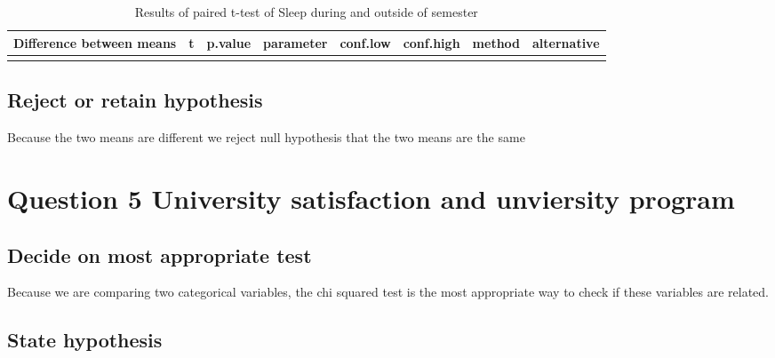 \documentclass[preprint, 3p,
authoryear]{elsarticle} %
\begin{document}
\begin{table}

\caption{\label{tab:unnamed-chunk-7}Results of paired t-test of Sleep during and outside of semester}
\centering
\fontsize{7}{9}\selectfont
\begin{tabular}[t]{r|r|r|r|r|r|l|l}
\hline
\textbf{Difference between means} & \textbf{t} & \textbf{p.value} & \textbf{parameter} & \textbf{conf.low} & \textbf{conf.high} & \textbf{method} & \textbf{alternative}\\
\hline
\cellcolor{gray!6}{-31.95} & \cellcolor{gray!6}{-8.38} & \cellcolor{gray!6}{0} & \cellcolor{gray!6}{249} & \cellcolor{gray!6}{-39.45} & \cellcolor{gray!6}{-24.44} & \cellcolor{gray!6}{Paired t-test} & \cellcolor{gray!6}{two.sided}\\
\hline
\end{tabular}
\end{table}

\hypertarget{reject-or-retain-hypothesis-1}{%
\subsection{Reject or retain
hypothesis}\label{reject-or-retain-hypothesis-1}}

Because the two means are different we reject null hypothesis that the
two means are the same

\hypertarget{question-5-university-satisfaction-and-unviersity-program}{%
\section{Question 5 University satisfaction and unviersity
program}\label{question-5-university-satisfaction-and-unviersity-program}}

\hypertarget{decide-on-most-appropriate-test-1}{%
\subsection{Decide on most appropriate
test}\label{decide-on-most-appropriate-test-1}}

Because we are comparing two categorical variables, the chi squared test
is the most appropriate way to check if these variables are related.

\hypertarget{state-hypothesis-2}{%
\subsection{State hypothesis}\label{state-hypothesis-2}}
\end{document}
